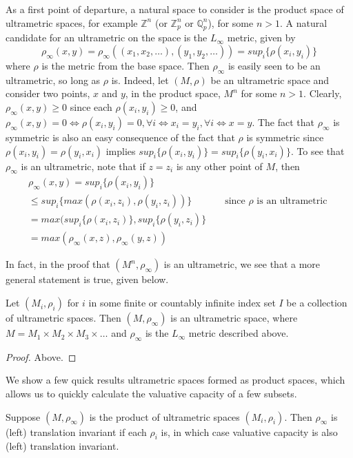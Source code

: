 As a first point of departure, a natural space to consider is the product space of ultrametric spaces, for example $\mathbb{Z}^n$ (or $\mathbb{Z}_p^n$ or $\mathbb{Q}_p^n$), for some $n >1$. A natural candidate for an ultrametric on the space is the $L_\infty$ metric, given by
\[ \rho_\infty(x,y) = \rho_\infty((x_1,x_2,\ldots),(y_1,y_2, \ldots)) = sup_{i} \{\rho(x_i, y_i)\}\] where $\rho$ is the metric from the base space. Then $\rho_\infty$ is easily seen to be an ultrametric, so long as $\rho$ is. Indeed, let $(M, \rho)$ be an ultrametric space and consider two points, $x$ and $y$, in the product space, $M^n$ for some $n >1$. Clearly, $\rho_\infty(x,y) \geq 0$ since each $\rho(x_i,y_i) \geq 0$, and $\rho_\infty(x,y) = 0 \iff \rho(x_i,y_i) =0,\forall i \iff x_i=y_i, \forall i \iff x=y$. The fact that $\rho_\infty$ is symmetric is also an easy consequence of the fact that $\rho$ is symmetric since  $\rho(x_i, y_i) = \rho(y_i, x_i)$ implies $sup_{i}\{\rho(x_i, y_i)\} = sup_{i}\{\rho(y_i, x_i)\}$. To see that $\rho_\infty$ is an ultrametric, note that if $z=z_i$ is any other point of $M$, then
\begin{align*}
    \rho_\infty(x, y) = sup_i\{\rho(x_i,y_i)\} && \\
    \leq  sup_i\{max(\rho(x_i,z_i),\rho(y_i,z_i))\} && \text{ since $\rho$ is an ultrametric } \\
    = max(sup_i\{\rho(x_i,z_i)\}, sup_i\{\rho(y_i,z_i)\} && \\
    = max(\rho_\infty(x,z),\rho_\infty(y,z))  
\end{align*}

In fact, in the proof that $(M^n, \rho_\infty)$ is an ultrametric, we see that a more general statement is true, given below.

\begin{proposition*}
Let $(M_i, \rho_i)$ for $i$ in some finite or countably infinite index set $I$ be a collection of ultrametric spaces. Then $(M,\rho_\infty)$ is an ultrametric space, where $M=M_1 \times M_2 \times M_3 \times \ldots$ and $\rho_\infty$ is the  $L_\infty$ metric described above.
\end{proposition*}

\begin{proof}
Above.
\end{proof}

We show a few quick results ultrametric spaces formed as product spaces, which allows us to quickly calculate the valuative capacity of a few subsets. 

\begin{proposition*}
Suppose $(M,\rho_\infty)$ is the product of ultrametric spaces $(M_i, \rho_i)$. Then $\rho_\infty$ is (left) translation invariant if each $\rho_i$ is, in which case valuative capacity is also (left) translation invariant.
\end{proposition*}

